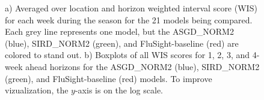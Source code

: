 \documentclass[ba]{imsart}
\theoremstyle{plain}
\theoremstyle{definition}
\theoremstyle{remark}
\begin{document}
\begin{supplement}
\begin{figure}[hbt!]
\begin{adjustwidth}{-1.2cm}{-1.5cm}
    \centering
    \end{adjustwidth}
    \caption{a) Averaged over location and horizon weighted interval score
    (WIS) for each week during the season for the 21 models being compared.
    Each grey line represents one model, but the ASGD\_NORM2 (blue),
    SIRD\_NORM2 (green), and
    FluSight-baseline (red) are colored to stand out.
    b) Boxplots of all WIS scores for 1, 2, 3, and 4-week ahead horizons
    for the ASGD\_NORM2 (blue), SIRD\_NORM2 (green), and
    FluSight-baseline (red) models.
    To improve vizualization, the $y$-axis
    is on the log scale.}
    \label{fig:wis_cover_sum1}
    
\end{figure}




\end{supplement}
\end{document}

